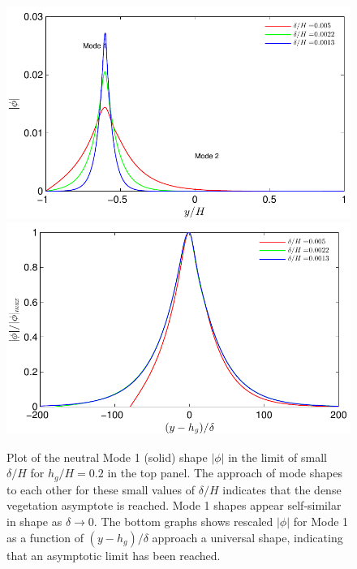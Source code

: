 \documentclass[12pt]{report}   %
\newcommand{\hg}{h_g}
\newcommand{\Rey}{{R}}
\newcommand{\Ndg}{\tilde{N}_g}
\begin{document}
\begin{figure}
{\includegraphics[scale=1.1]{Asymptotic_noshear}}\\
 \includegraphics[scale=1.1]{Asymptotic_noshear2}
\caption{
Plot of the neutral Mode 1 (solid) shape $|\phi|$ in the limit of small $\delta/H$ for $\hg/H=0.2$ in the top panel.
The approach of mode shapes to each other for these small values of $\delta/H$ indicates that the dense vegetation asymptote is reached. 
Mode 1 shapes appear self-similar in shape as $\delta\to 0$.
The bottom graphs shows rescaled $|\phi|$ for Mode 1 as a function of $(y-\hg)/\delta$ approach a universal shape, indicating that an asymptotic limit has been reached. 
}
\label{Asymptotic_mode}
\end{figure}
\end{document}
